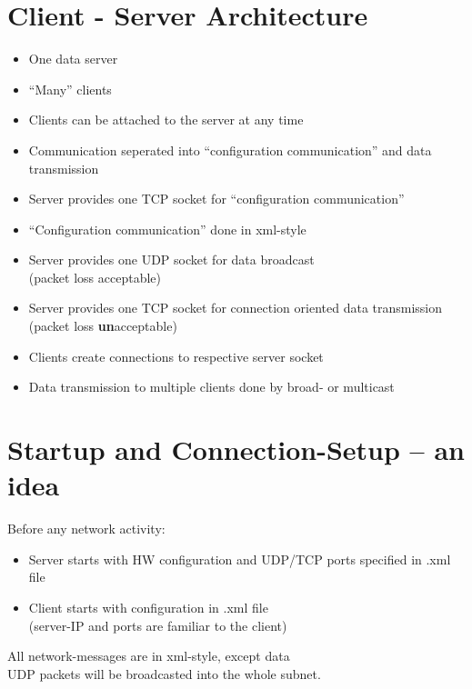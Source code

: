 \documentclass[11pt]{scrartcl}
\begin{document}
\section{Client - Server Architecture}
  \begin{itemize}
    \item One data server
    \item ``Many'' clients
    \item Clients can be attached to the server at any time
    \item Communication seperated into ``configuration communication'' and data transmission
    \item Server provides one TCP socket for ``configuration communication''
    \item ``Configuration communication'' done in xml-style
    \item Server provides one UDP socket for data broadcast\\
      \hspace*{0.2cm} (packet loss acceptable)
    \item Server provides one TCP socket for connection oriented data transmission\\
      \hspace*{0.2cm} (packet loss \textbf{un}acceptable)
    \newline
    \item Clients create connections to respective server socket
    \item Data transmission to multiple clients done by broad- or multicast
  \end{itemize}

\section{Startup and Connection-Setup -- an idea}

  Before any network activity:
  \begin{itemize}
    \item Server starts with HW configuration and UDP/TCP ports specified in .xml file
    \item Client starts with configuration in .xml file\\
      \hspace*{0.2cm} (server-IP and ports are familiar to the client)
  \end{itemize}

  All network-messages are in xml-style, except data\\
  UDP packets will be broadcasted into the whole subnet.\\
\end{document}
